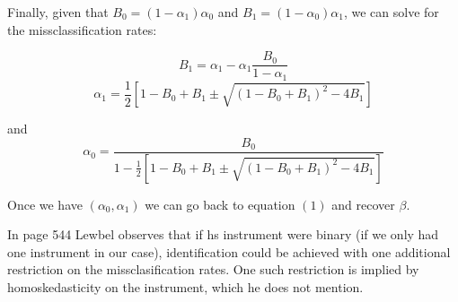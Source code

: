 Finally, given that $B_{0}=(1-\alpha_{1})\alpha_{0}$ and $B_{1}=(1-\alpha_{0})\alpha_{1}$,
we can solve for the missclassification rates:

\[
B_{1}=\alpha_{1}-\alpha_{1}\frac{B_{0}}{1-\alpha_{1}}
\]
\[
\alpha_{1}=\frac{1}{2}\left[1-B_{0}+B_{1}\pm\sqrt{(1-B_{0}+B_{1})^{2}-4B_{1}}\right]
\]


and 
\[
\alpha_{0}=\frac{B_{0}}{1-\frac{1}{2}\left[1-B_{0}+B_{1}\pm\sqrt{(1-B_{0}+B_{1})^{2}-4B_{1}}\right]}
\]

Once we have $(\alpha_{0},\alpha_{1})$ we can go back to equation
$(1)$ and recover $\beta$.

In page 544 Lewbel observes that if hs instrument were binary (if
we only had one instrument in our case), identification could be achieved
with one additional restriction on the missclasification rates. One
such restriction is implied by homoskedasticity on the instrument,
which he does not mention. 
